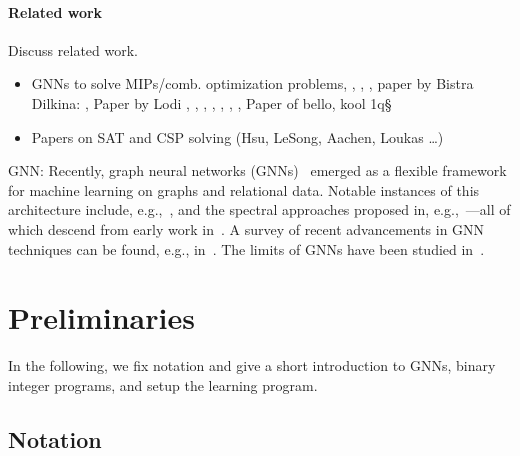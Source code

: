 \documentclass[11pt, DIV=12]{scrartcl}
\theoremstyle{definition}
\begin{document}
\paragraph{Related work} Discuss related work.
\begin{itemize}
	\item GNNs to solve MIPs/comb. optimization problems, \cite{Li+2018b}, \cite{Vel+2020}, \cite{Gas+2019} \cite{Gup+2020} \cite{Kha+2016}, paper by Bistra Dilkina: \cite{Fer+2020} \cite{Son+2020} \cite{Wil+2019} \cite{Kha+2016b}, Paper by Lodi \cite{Ben+2018}, \cite{Lar+2018}, \cite{Bon+2018}, \cite{Ben+2019}, \cite{Fis+2019}, \cite{Gup+2020}, \cite{Zar+2020},	
	Paper of bello, kool	1q§
	
	\item Papers on SAT and CSP solving (Hsu, LeSong, Aachen, Loukas \dots) \cite{Sel+2019}
\end{itemize}
 

GNN: Recently, graph neural networks (GNNs)~\cite{Gil+2017,Sca+2009} emerged as a flexible framework for machine learning on graphs and relational data. Notable instances of this architecture include, e.g.,~\cite{Duv+2015,Ham+2017,Vel+2018}, and the spectral approaches proposed in, e.g.,~\cite{Bru+2014,Def+2015,Kip+2017,Mon+2017}---all of which descend from early work in~\cite{Kir+1995,Mer+2005,Spe+1997,Sca+2009}. A survey of recent advancements in GNN techniques can be found, e.g., in~\cite{Cha+2020,Wu+2019,Zho+2018}. The limits of GNNs have been studied in~\cite{Bar+2020,Che+2019,Mae+2019,Mar+2019,Mor+2019,Xu+2018b}.


\section{Preliminaries}

In the following, we fix notation and give a short introduction to GNNs, binary integer programs, and setup the learning program.

\subsection{Notation}
\end{document}
